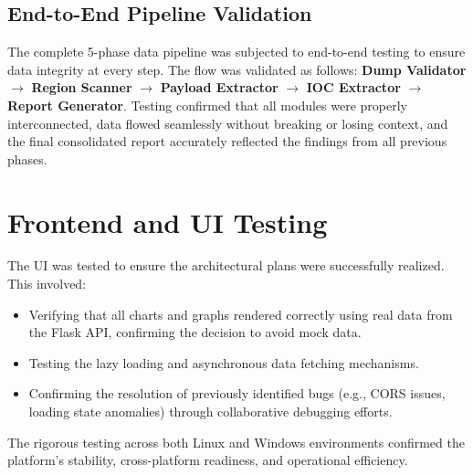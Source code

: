 \subsection{End-to-End Pipeline Validation}
The complete 5-phase data pipeline was subjected to end-to-end testing to ensure data integrity at every step. The flow was validated as follows:
\textbf{Dump Validator} $\rightarrow$ \textbf{Region Scanner} $\rightarrow$ \textbf{Payload Extractor} $\rightarrow$ \textbf{IOC Extractor} $\rightarrow$ \textbf{Report Generator}.
Testing confirmed that all modules were properly interconnected, data flowed seamlessly without breaking or losing context, and the final consolidated report accurately reflected the findings from all previous phases.

\section{Frontend and UI Testing}
The UI was tested to ensure the architectural plans were successfully realized. This involved:
\begin{itemize}
    \item Verifying that all charts and graphs rendered correctly using real data from the Flask API, confirming the decision to avoid mock data.
    \item Testing the lazy loading and asynchronous data fetching mechanisms.
    \item Confirming the resolution of previously identified bugs (e.g., CORS issues, loading state anomalies) through collaborative debugging efforts.
\end{itemize}
The rigorous testing across both Linux and Windows environments confirmed the platform's stability, cross-platform readiness, and operational efficiency.
